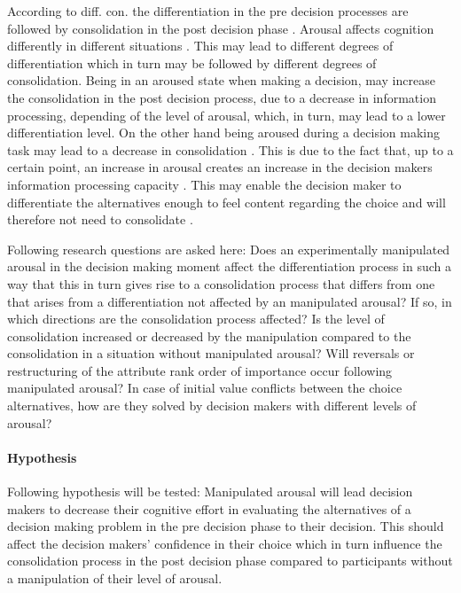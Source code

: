 \documentclass[jou,11pt]{apa6}
\begin{document}
According to diff. con. the differentiation  in the pre decision
processes are followed by consolidation in the post decision phase
\parencite{Svensson95}.  Arousal affects cognition differently in  different
situations \parencite{FiskeTaylor91}.  This may lead to different degrees
of differentiation which in turn may be followed by different degrees
of consolidation.  Being in an aroused state when making a decision,
may increase the consolidation in the post decision process, due to a
decrease in information processing, depending of the level of arousal,
which, in turn, may lead to a lower differentiation level.  On the
other hand being aroused during a decision making task may lead to a
decrease in consolidation \parencite{Svensson95}. This is due to  the fact
that, up to a certain point, an increase in arousal creates an
increase in the decision makers information processing capacity
\parencite{Easterbrook59}. This may enable the decision maker to
differentiate the alternatives enough to feel content regarding the
choice and will therefore not need to consolidate \parencite{svensson92b}.

Following research questions are asked here:  Does an experimentally
manipulated arousal in the decision making moment affect the
differentiation process in such a way that this in turn gives rise to
a consolidation process that differs from one that arises from a
differentiation not affected by an manipulated arousal?  If so, in
which directions are the consolidation process affected? Is the level
of consolidation increased or decreased by the manipulation compared
to the consolidation in a situation without manipulated arousal?  Will
reversals or restructuring of the attribute rank order of importance
occur following manipulated arousal? In case of initial value
conflicts between the choice alternatives,  how are they solved by
decision makers with different levels of arousal?

\paragraph{Hypothesis} Following hypothesis will be tested: Manipulated arousal
will lead decision makers to decrease their cognitive effort in
evaluating the alternatives of a decision making problem in the pre
decision phase to their decision.  This should affect the decision
makers' confidence in their choice which in turn influence the
consolidation process in the post decision phase compared to
participants without a manipulation of their level of arousal.
\end{document}
